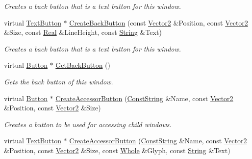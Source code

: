 \begin{DoxyCompactItemize}
\begin{DoxyCompactList}\small\item\em Creates a back button that is a text button for this window. \item\end{DoxyCompactList}\item 
virtual \hyperlink{classphys_1_1UI_1_1TextButton}{TextButton} $\ast$ \hyperlink{classphys_1_1UI_1_1MenuWindow_a18240595f7ebb16f856bdbd23318de67}{CreateBackButton} (const \hyperlink{classphys_1_1Vector2}{Vector2} \&Position, const \hyperlink{classphys_1_1Vector2}{Vector2} \&Size, const \hyperlink{namespacephys_af7eb897198d265b8e868f45240230d5f}{Real} \&LineHeight, const \hyperlink{namespacephys_aa03900411993de7fbfec4789bc1d392e}{String} \&Text)
\begin{DoxyCompactList}\small\item\em Creates a back button that is a text button for this window. \item\end{DoxyCompactList}\item 
virtual \hyperlink{classphys_1_1UI_1_1Button}{Button} $\ast$ \hyperlink{classphys_1_1UI_1_1MenuWindow_a7c286758bac0e21154f41a56d9da8c08}{GetBackButton} ()
\begin{DoxyCompactList}\small\item\em Gets the back button of this window. \item\end{DoxyCompactList}\item 
virtual \hyperlink{classphys_1_1UI_1_1Button}{Button} $\ast$ \hyperlink{classphys_1_1UI_1_1MenuWindow_aea2162ee7cba6cf3f9fc903ccc40550b}{CreateAccessorButton} (\hyperlink{namespacephys_a5ce5049f8b4bf88d6413c47b504ebb31}{ConstString} \&Name, const \hyperlink{classphys_1_1Vector2}{Vector2} \&Position, const \hyperlink{classphys_1_1Vector2}{Vector2} \&Size)
\begin{DoxyCompactList}\small\item\em Creates a button to be used for accessing child windows. \item\end{DoxyCompactList}\item 
virtual \hyperlink{classphys_1_1UI_1_1TextButton}{TextButton} $\ast$ \hyperlink{classphys_1_1UI_1_1MenuWindow_a6555dd866b1ed3ac65b2446574052690}{CreateAccessorButton} (\hyperlink{namespacephys_a5ce5049f8b4bf88d6413c47b504ebb31}{ConstString} \&Name, const \hyperlink{classphys_1_1Vector2}{Vector2} \&Position, const \hyperlink{classphys_1_1Vector2}{Vector2} \&Size, const \hyperlink{namespacephys_a460f6bc24c8dd347b05e0366ae34f34a}{Whole} \&Glyph, const \hyperlink{namespacephys_aa03900411993de7fbfec4789bc1d392e}{String} \&Text)

\end{DoxyCompactItemize}
